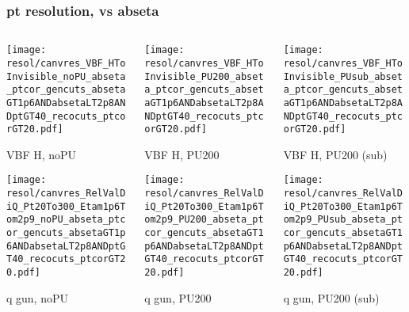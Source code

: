 \documentclass[8pt]{beamer}
\begin{document}
  \begin{frame}
  \frametitle{pt resolution, vs abseta}
  
  \begin{columns}
   \begin{column}{0.35\textwidth}
     \texttt{[image: resol/canvres\_VBF\_HToInvisible\_noPU\_abseta\_ptcor\_gencuts\_absetaGT1p6ANDabsetaLT2p8ANDptGT40\_recocuts\_ptcorGT20.pdf]}
     
     VBF H, noPU
    
     \texttt{[image: resol/canvres\_RelValDiQ\_Pt20To300\_Etam1p6Tom2p9\_noPU\_abseta\_ptcor\_gencuts\_absetaGT1p6ANDabsetaLT2p8ANDptGT40\_recocuts\_ptcorGT20.pdf]}
     
     q gun, noPU
   \end{column}
   \begin{column}{0.35\textwidth}
     \texttt{[image: resol/canvres\_VBF\_HToInvisible\_PU200\_abseta\_ptcor\_gencuts\_absetaGT1p6ANDabsetaLT2p8ANDptGT40\_recocuts\_ptcorGT20.pdf]}
     
     VBF H, PU200
    
     \texttt{[image: resol/canvres\_RelValDiQ\_Pt20To300\_Etam1p6Tom2p9\_PU200\_abseta\_ptcor\_gencuts\_absetaGT1p6ANDabsetaLT2p8ANDptGT40\_recocuts\_ptcorGT20.pdf]}
     
     q gun, PU200
   \end{column}
   \begin{column}{0.35\textwidth}
     \texttt{[image: resol/canvres\_VBF\_HToInvisible\_PUsub\_abseta\_ptcor\_gencuts\_absetaGT1p6ANDabsetaLT2p8ANDptGT40\_recocuts\_ptcorGT20.pdf]}
     
     VBF H, PU200 (sub)
    
     \texttt{[image: resol/canvres\_RelValDiQ\_Pt20To300\_Etam1p6Tom2p9\_PUsub\_abseta\_ptcor\_gencuts\_absetaGT1p6ANDabsetaLT2p8ANDptGT40\_recocuts\_ptcorGT20.pdf]}
     
     q gun, PU200 (sub)
   \end{column}
  \end{columns}
 \end{frame}
%  
%   
\end{document}
